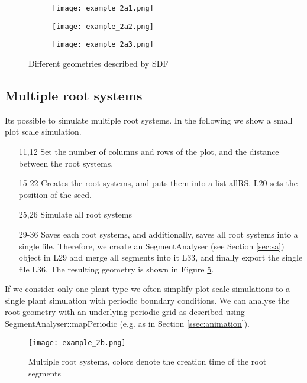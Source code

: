 
\begin{figure}
\begin{subfigure}[c]{0.3\textwidth}
\texttt{[image: example\_2a1.png]}
 \label{fig:rhizo}
\end{subfigure}
\begin{subfigure}[c]{0.3\textwidth}
\texttt{[image: example\_2a2.png]}
 \label{fig:split}
\end{subfigure}
\begin{subfigure}[c]{0.3\textwidth}
\texttt{[image: example\_2a3.png]}
 \label{fig:rhizotubes}
\end{subfigure}
\caption{Different geometries described by SDF}
\end{figure}

\subsection{Multiple root systems}

Its possible to simulate multiple root systems. In the following we show a small plot scale simulation.



\begin{itemize}

\item[11,12] Set the number of columns and rows of the plot, and the distance between the root systems.

\item[15-22] Creates the root systems, and puts them into a list allRS. L20 sets the position of the seed. 

\item[25,26] Simulate all root systems 

\item[29-36] Saves each root systems, and additionally, saves all root systems into a single file. 
Therefore, we create an SegmentAnalyser (see Section \ref{sec:sa}) object in L29 and merge all segments into it L33, 
and finally export the single file L36. The resulting geometry is shown in Figure \ref{fig:multiple}.

\end{itemize}

If we consider only one plant type we often simplify plot scale simulations to a single plant simulation with periodic boundary conditions. We can analyse the root geometry with an underlying periodic grid as described using SegmentAnalyser::mapPeriodic (e.g. as in Section \ref{ssec:animation}). 

\begin{figure}
\centering
\texttt{[image: example\_2b.png]}
\caption{Multiple root systems, colors denote the creation time of the root segments} \label{fig:multiple}
\end{figure}
